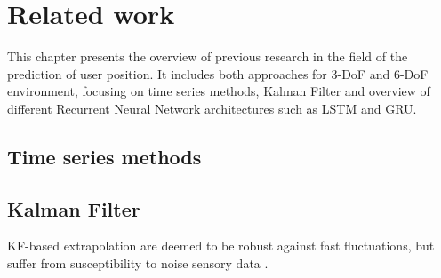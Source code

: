 \chapter{Related work}
\label{sec:related}
This chapter presents the overview of previous research in the field of the prediction of user position. It includes both approaches for 3-DoF and 6-DoF environment, focusing on time series methods, Kalman Filter and overview of different  Recurrent Neural Network architectures such as LSTM and GRU.  


\section{Time series methods}
\label{sec:related:timeseries}

\section{Kalman Filter}
\label{sec:related:kalman}

KF-based extrapolation are deemed to be robust against fast fluctuations, but suffer from susceptibility to noise sensory data \cite{delay_compensation_360}.

